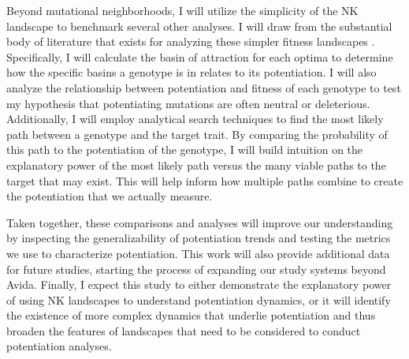 Beyond mutational neighborhoods, I will utilize the simplicity of the NK landscape to benchmark several other analyses. 
I will draw from the substantial body of literature that exists for analyzing these simpler fitness landscapes \citep{malanSurveyTechniquesCharacterising2013, hornGeneticAlgorithmDifficulty1995}.
Specifically, I will calculate the basin of attraction \citep{ostmanPredictingEvolutionVisualizing2014} for each optima to determine how the specific basins a genotype is in relates to its potentiation. 
I will also analyze the relationship between potentiation and fitness of each genotype to test my hypothesis that potentiating mutations are often neutral or deleterious. 
Additionally, I will employ analytical search techniques to find the most likely path between a genotype and the target trait. %
By comparing the probability of this path to the potentiation of the genotype, I will build intuition on the explanatory power of the most likely path versus the many viable paths to the target that may exist. 
This will help inform how multiple paths combine to create the potentiation that we actually measure. 

Taken together, these comparisons and analyses will improve our understanding by inspecting the generalizability of potentiation trends and testing the metrics we use to characterize potentiation. 
This work will also provide additional data for future studies, starting the process of expanding our study systems beyond Avida. 
Finally, I expect this study to either demonstrate the explanatory power of using NK landscapes to understand potentiation dynamics, or it will identify the existence of more complex dynamics that underlie potentiation and thus broaden the features of landscapes that need to be considered to conduct potentiation analyses.




